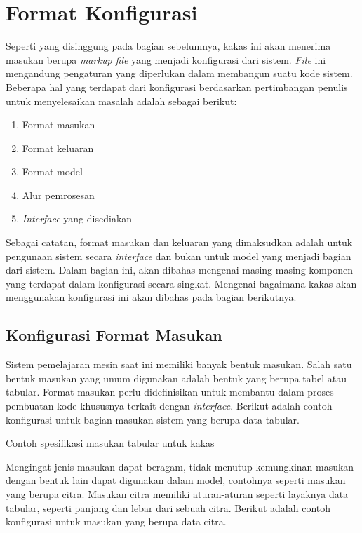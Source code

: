 \section{Format Konfigurasi}

Seperti yang disinggung pada bagian sebelumnya, kakas ini akan menerima masukan berupa \textit{markup file} yang menjadi konfigurasi dari sistem.
\textit{File} ini mengandung pengaturan yang diperlukan dalam membangun suatu kode sistem.
Beberapa hal yang terdapat dari konfigurasi berdasarkan pertimbangan penulis untuk menyelesaikan masalah adalah sebagai berikut:

\begin{enumerate}
	\item Format masukan
	\item Format keluaran
	\item Format model
	\item Alur pemrosesan
	\item \textit{Interface} yang disediakan
\end{enumerate}

Sebagai catatan, format masukan dan keluaran yang dimaksudkan adalah untuk pengunaan sistem secara \textit{interface} dan bukan untuk model yang menjadi bagian dari sistem.
Dalam bagian ini, akan dibahas mengenai masing-masing komponen yang terdapat dalam konfigurasi secara singkat.
Mengenai bagaimana kakas akan menggunakan konfigurasi ini akan dibahas pada bagian berikutnya.

\subsection{Konfigurasi Format Masukan}\label{section:03-input-format}

Sistem pemelajaran mesin saat ini memiliki banyak bentuk masukan.
Salah satu bentuk masukan yang umum digunakan adalah bentuk yang berupa tabel atau tabular.
Format masukan perlu didefinisikan untuk membantu dalam proses pembuatan kode khususnya terkait dengan \textit{interface}.
Berikut adalah contoh konfigurasi untuk bagian masukan sistem yang berupa data tabular.

\begin{code}
	\caption{Contoh spesifikasi masukan tabular untuk kakas}
	\label{listing:1}
\end{code}

Mengingat jenis masukan dapat beragam, tidak menutup kemungkinan masukan dengan bentuk lain dapat digunakan dalam model, contohnya seperti masukan yang berupa citra.
Masukan citra memiliki aturan-aturan seperti layaknya data tabular, seperti panjang dan lebar dari sebuah citra.
Berikut adalah contoh konfigurasi untuk masukan yang berupa data citra.

